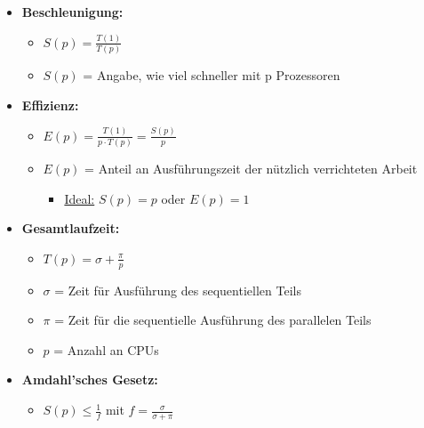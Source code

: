 \begin{itemize}
\item \textbf{Beschleunigung:}
\begin{itemize}
\item {\LARGE ${S}{\left(p\right)}=\frac{T\left(1\right)}{T\left(p\right)}$}
\item ${S}{\left(p\right)}$ = Angabe, wie viel schneller mit p Prozessoren
\end{itemize}
\item \textbf{Effizienz:}
\begin{itemize}
\item {\LARGE ${E}{\left(p\right)}=\frac{T\left(1\right)}{p\cdot T\left(p\right)}=\frac{{S}{\left(p\right)}}{p}$}
\item ${E}{\left(p\right)}$ = Anteil an Ausführungszeit der nützlich verrichteten Arbeit
\begin{itemize}
\item \underline{Ideal:} ${S}{\left(p\right)} = {p}$ oder ${E}{\left(p\right)} = {1}$
\end{itemize}
\end{itemize}
\item \textbf{Gesamtlaufzeit:}
\begin{itemize}
\item {\LARGE ${T}{\left(p\right)} = \sigma + \frac{\pi}{{p}}$}
\item $\sigma$ = Zeit für Ausführung des sequentiellen Teils
\item $\pi$ = Zeit für die sequentielle Ausführung des parallelen Teils
\item ${p}$ = Anzahl an CPUs
\end{itemize}
\item \textbf{Amdahl'sches Gesetz:}
\begin{itemize}
\item {\LARGE ${S}{\left(p\right)} \le \frac{1}{f}$} mit {\LARGE ${f} = \frac{\sigma}{\sigma + \pi}$}
\end{itemize}
\end{itemize}